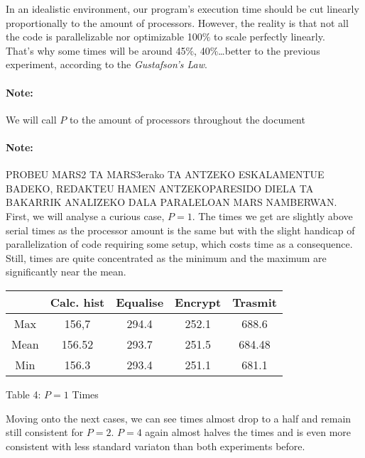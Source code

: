 \documentclass[12pt]{article}
\begin{document}
In an idealistic environment, our program's execution time should be cut linearly proportionally to the amount of processors. However, the reality is that not all the code is parallelizable nor optimizable 100$\%$ to scale perfectly linearly.\\
That's why some times will be around 45$\%$, 40$\%$\ldots better to the previous experiment, according to the \textit{Gustafson's Law}\cite{gustafson}.

\paragraph{Note:}
We will call $P$ to the amount of processors throughout the document\\

\paragraph{Note:}
PROBEU MARS2 TA MARS3erako TA ANTZEKO ESKALAMENTUE BADEKO, REDAKTEU HAMEN ANTZEKOPARESIDO DIELA TA BAKARRIK ANALIZEKO DALA PARALELOAN MARS NAMBERWAN.\\

First, we will analyse a curious case, $P=1$. The times we get are slightly above serial times as the processor amount is the same but with the slight handicap of parallelization of code requiring some setup, which costs time as a consequence.\\
Still, times are quite concentrated as the minimum and the maximum are significantly near the mean.

\begin{center}

\begin{tabular}{|c|c|c|c|c|}
																	\hline
			&Calc. hist	&Equalise	&	Encrypt	&	Trasmit		\\	\hline
	Max		&	156,7	&	294.4	&	252.1	&	688.6		\\	\hline
	Mean	&	156.52	&	293.7	&	251.5	&	684.48		\\	\hline
	Min		&	156.3	&	293.4	&	251.1	&	681.1		\\	\hline
\end{tabular}

\vspace{0.3cm}
Table 4: $P=1$ Times
\end{center}

\vspace{0.5cm}

Moving onto the next cases, we can see times almost drop to a half and remain still consistent for $P=2$. $P=4$ again almost halves the times and is even more consistent with less standard variaton than both experiments before.
\end{document}
